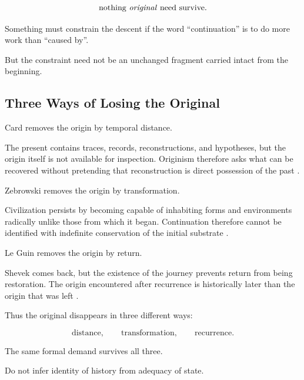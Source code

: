 \documentclass[
  11pt,
  a4paper,
  DIV=12,
  BCOR=0mm,
  parskip=half-
]{scrartcl}
\theoremstyle{definition}
\theoremstyle{plain}
\theoremstyle{remark}
\begin{document}
\[
  \text{nothing \emph{original} need survive}.
\]

Something must constrain the descent if the word \enquote{continuation} is to
do more work than \enquote{caused by}.

But the constraint need not be an unchanged fragment carried intact from the
beginning.


\subsection{Three Ways of Losing the Original}
\label{sec:three-losses}

Card removes the origin by temporal distance.

The present contains traces, records, reconstructions, and hypotheses, but the
origin itself is not available for inspection. Originism therefore asks what
can be recovered without pretending that reconstruction is direct possession
of the past \cite{card1989}.

Zebrowski removes the origin by transformation.

Civilization persists by becoming capable of inhabiting forms and environments
radically unlike those from which it began. Continuation therefore cannot be
identified with indefinite conservation of the initial substrate
\cite{zebrowski1979}.

Le Guin removes the origin by return.

Shevek comes back, but the existence of the journey prevents return from being
restoration. The origin encountered after recurrence is historically later
than the origin that was left \cite{leguin1974}.

Thus the original disappears in three different ways:

\[
  \text{distance},
  \qquad
  \text{transformation},
  \qquad
  \text{recurrence}.
\]

The same formal demand survives all three.

Do not infer identity of history from adequacy of state.

\end{document}
